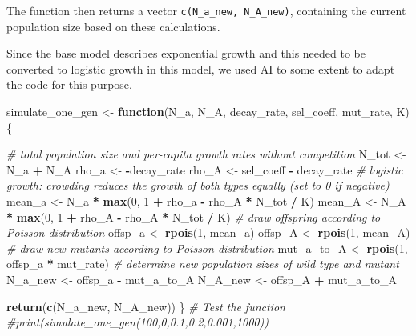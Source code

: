 \documentclass[
]{article}
\newenvironment{Shaded}{\begin{snugshade}}{\end{snugshade}}
\newcommand{\CommentTok}[1]{\textcolor[rgb]{0.56,0.35,0.01}{\textit{#1}}}
\newcommand{\ControlFlowTok}[1]{\textcolor[rgb]{0.13,0.29,0.53}{\textbf{#1}}}
\newcommand{\DecValTok}[1]{\textcolor[rgb]{0.00,0.00,0.81}{#1}}
\newcommand{\FunctionTok}[1]{\textcolor[rgb]{0.13,0.29,0.53}{\textbf{#1}}}
\newcommand{\NormalTok}[1]{#1}
\newcommand{\OtherTok}[1]{\textcolor[rgb]{0.56,0.35,0.01}{#1}}
\newcommand{\SpecialCharTok}[1]{\textcolor[rgb]{0.81,0.36,0.00}{\textbf{#1}}}
\begin{document}
The function then returns a vector \texttt{c(N\_a\_new,\ N\_A\_new)},
containing the current population size based on these calculations.

Since the base model describes exponential growth and this needed to be
converted to logistic growth in this model, we used AI to some extent to
adapt the code for this purpose.

\begin{Shaded}
\begin{Highlighting}[]
\NormalTok{simulate\_one\_gen }\OtherTok{\textless{}{-}} \ControlFlowTok{function}\NormalTok{(N\_a, N\_A, decay\_rate, sel\_coeff, mut\_rate, K) \{}
  
  \CommentTok{\# total population size and per{-}capita growth rates without competition}
\NormalTok{  N\_tot }\OtherTok{\textless{}{-}}\NormalTok{ N\_a }\SpecialCharTok{+}\NormalTok{ N\_A}
\NormalTok{  rho\_a }\OtherTok{\textless{}{-}} \SpecialCharTok{{-}}\NormalTok{decay\_rate}
\NormalTok{  rho\_A }\OtherTok{\textless{}{-}}\NormalTok{ sel\_coeff }\SpecialCharTok{{-}}\NormalTok{ decay\_rate}
  \CommentTok{\# logistic growth: crowding reduces the growth of both types equally (set to 0 if negative)}
\NormalTok{  mean\_a }\OtherTok{\textless{}{-}}\NormalTok{ N\_a }\SpecialCharTok{*} \FunctionTok{max}\NormalTok{(}\DecValTok{0}\NormalTok{, }\DecValTok{1} \SpecialCharTok{+}\NormalTok{ rho\_a }\SpecialCharTok{{-}}\NormalTok{ rho\_A }\SpecialCharTok{*}\NormalTok{ N\_tot }\SpecialCharTok{/}\NormalTok{ K)}
\NormalTok{  mean\_A }\OtherTok{\textless{}{-}}\NormalTok{ N\_A }\SpecialCharTok{*} \FunctionTok{max}\NormalTok{(}\DecValTok{0}\NormalTok{, }\DecValTok{1} \SpecialCharTok{+}\NormalTok{ rho\_A }\SpecialCharTok{{-}}\NormalTok{ rho\_A }\SpecialCharTok{*}\NormalTok{ N\_tot }\SpecialCharTok{/}\NormalTok{ K)}
  \CommentTok{\# draw offspring according to Poisson distribution}
\NormalTok{  offsp\_a }\OtherTok{\textless{}{-}} \FunctionTok{rpois}\NormalTok{(}\DecValTok{1}\NormalTok{, mean\_a)}
\NormalTok{  offsp\_A }\OtherTok{\textless{}{-}} \FunctionTok{rpois}\NormalTok{(}\DecValTok{1}\NormalTok{, mean\_A)}
  \CommentTok{\# draw new mutants according to Poisson distribution}
\NormalTok{  mut\_a\_to\_A }\OtherTok{\textless{}{-}} \FunctionTok{rpois}\NormalTok{(}\DecValTok{1}\NormalTok{, offsp\_a }\SpecialCharTok{*}\NormalTok{ mut\_rate)}
  \CommentTok{\# determine new population sizes of wild type and mutant}
\NormalTok{  N\_a\_new }\OtherTok{\textless{}{-}}\NormalTok{ offsp\_a }\SpecialCharTok{{-}}\NormalTok{ mut\_a\_to\_A}
\NormalTok{  N\_A\_new }\OtherTok{\textless{}{-}}\NormalTok{  offsp\_A }\SpecialCharTok{+}\NormalTok{ mut\_a\_to\_A}
  
  \FunctionTok{return}\NormalTok{(}\FunctionTok{c}\NormalTok{(N\_a\_new, N\_A\_new))}
\NormalTok{\}}
\CommentTok{\# Test the function}
\CommentTok{\#print(simulate\_one\_gen(100,0,0.1,0.2,0.001,1000))}
\end{Highlighting}
\end{Shaded}
\end{document}
